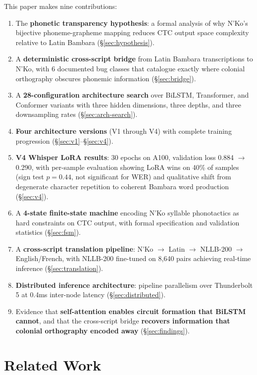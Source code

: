 \documentclass[11pt]{article}
\begin{document}
This paper makes nine contributions:

\begin{enumerate}
\item The \textbf{phonetic transparency hypothesis}: a formal analysis of why N'Ko's bijective phoneme-grapheme mapping reduces CTC output space complexity relative to Latin Bambara (\S\ref{sec:hypothesis}).
\item A \textbf{deterministic cross-script bridge} from Latin Bambara transcriptions to N'Ko, with 6 documented bug classes that catalogue exactly where colonial orthography obscures phonemic information (\S\ref{sec:bridge}).
\item A \textbf{28-configuration architecture search} over BiLSTM, Transformer, and Conformer variants with three hidden dimensions, three depths, and three downsampling rates (\S\ref{sec:arch-search}).
\item \textbf{Four architecture versions} (V1 through V4) with complete training progression (\S\ref{sec:v1}--\S\ref{sec:v4}).
\item \textbf{V4 Whisper LoRA results}: 30 epochs on A100, validation loss 0.884 $\to$ 0.290, with per-sample evaluation showing LoRA wins on 40\% of samples (sign test $p = 0.44$, not significant for WER) and qualitative shift from degenerate character repetition to coherent Bambara word production (\S\ref{sec:v4}).
\item A \textbf{4-state finite-state machine} encoding N'Ko syllable phonotactics as hard constraints on CTC output, with formal specification and validation statistics (\S\ref{sec:fsm}).
\item A \textbf{cross-script translation pipeline}: N'Ko $\to$ Latin $\to$ NLLB-200 $\to$ English/French, with NLLB-200 fine-tuned on 8,640 pairs achieving real-time inference (\S\ref{sec:translation}).
\item \textbf{Distributed inference architecture}: pipeline parallelism over Thunderbolt 5 at 0.4ms inter-node latency (\S\ref{sec:distributed}).
\item Evidence that \textbf{self-attention enables circuit formation that BiLSTM cannot}, and that the cross-script bridge \textbf{recovers information that colonial orthography encoded away} (\S\ref{sec:findings}).
\end{enumerate}

\section{Related Work}
\end{document}
